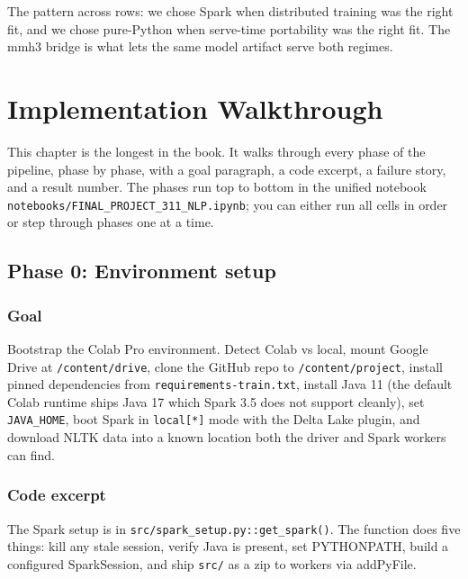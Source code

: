 \documentclass[11pt,letterpaper]{book}
\begin{document}
The pattern across rows: we chose Spark when distributed training was the right fit, and we chose pure-Python when serve-time portability was the right fit. The mmh3 bridge is what lets the same model artifact serve both regimes.


\chapter{Implementation Walkthrough}
\label{ch:implementation}

This chapter is the longest in the book. It walks through every phase of the pipeline, phase by phase, with a goal paragraph, a code excerpt, a failure story, and a result number. The phases run top to bottom in the unified notebook \texttt{notebooks/FINAL\_PROJECT\_311\_NLP.ipynb}; you can either run all cells in order or step through phases one at a time.

\section{Phase 0: Environment setup}
\label{sec:phase0}

\subsection*{Goal}

Bootstrap the Colab Pro environment. Detect Colab vs local, mount Google Drive at \texttt{/content/drive}, clone the GitHub repo to \texttt{/content/project}, install pinned dependencies from \texttt{requirements-train.txt}, install Java 11 (the default Colab runtime ships Java 17 which Spark 3.5 does not support cleanly), set \texttt{JAVA\_HOME}, boot Spark in \texttt{local[*]} mode with the Delta Lake plugin, and download NLTK data into a known location both the driver and Spark workers can find.

\subsection*{Code excerpt}

The Spark setup is in \texttt{src/spark\_setup.py::get\_spark()}. The function does five things: kill any stale session, verify Java is present, set PYTHONPATH, build a configured SparkSession, and ship \texttt{src/} as a zip to workers via addPyFile.
\end{document}
